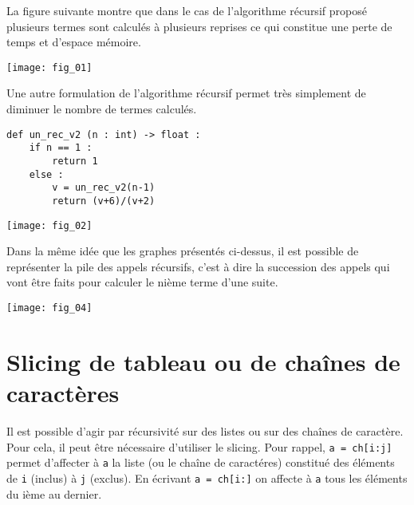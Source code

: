 La figure suivante montre que dans le cas de l'algorithme récursif proposé plusieurs termes sont calculés à plusieurs reprises ce qui constitue une perte de temps et d'espace mémoire. 

\begin{center}
\texttt{[image: fig\_01]}
\end{center}

Une autre formulation de l'algorithme récursif permet très simplement de diminuer le nombre de termes calculés. 



\noindent\begin{minipage}[c]{.45\linewidth}
\begin{lstlisting}
def un_rec_v2 (n : int) -> float :
    if n == 1 :
        return 1
    else : 
        v = un_rec_v2(n-1)
        return (v+6)/(v+2)
\end{lstlisting}
\end{minipage} \hfill
\begin{minipage}[c]{.45\linewidth}
\begin{center}
\texttt{[image: fig\_02]}
\end{center}\end{minipage}


Dans la même idée que les graphes présentés ci-dessus, il est possible de représenter la pile des appels récursifs, c'est à dire la succession des appels qui vont être faits pour calculer le nième terme d'une suite. 

\begin{center}
\texttt{[image: fig\_04]}
\end{center}

\section{Slicing de tableau ou de chaînes de caractères}
Il est possible d'agir par récursivité sur des listes ou sur des chaînes de caractère. Pour cela, il peut être nécessaire d'utiliser le slicing. Pour rappel, \texttt{a = ch[i:j]} permet d'affecter à \texttt{a} la liste (ou le chaîne de caractéres) constitué des éléments de \texttt{i} (inclus) à \texttt{j} (exclus). En écrivant \texttt{a = ch[i:]} on affecte à \texttt{a} tous les éléments du ième au dernier.


\vspace{.5cm}

